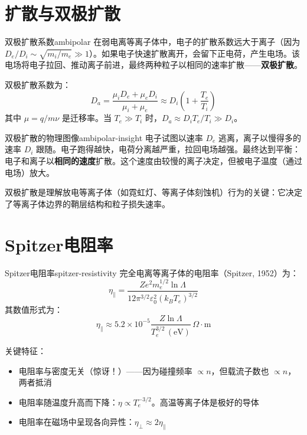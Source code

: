 \documentclass[12pt,a4paper,openany,oneside]{book}
\newcommand{\eps}{\varepsilon}
\newcommand{\difficulty}[1]{\marginnote{\textcolor{red}{\textbf{[#1]}}}}
\begin{document}
\section{扩散与双极扩散}\difficulty{基础}

\begin{theorem}{双极扩散系数}{ambipolar}
在弱电离等离子体中，电子的扩散系数远大于离子（因为 $D_e/D_i \sim \sqrt{m_i/m_e} \gg 1$）。如果电子快速扩散离开，会留下正电荷，产生电场。该电场将电子拉回、推动离子前进，最终两种粒子以相同的速率扩散——\textbf{双极扩散}。

双极扩散系数为：
\[
D_a = \frac{\mu_i D_e + \mu_e D_i}{\mu_i + \mu_e} \approx D_i\left(1 + \frac{T_e}{T_i}\right)
\]
其中 $\mu = q/m\nu$ 是迁移率。当 $T_e \gg T_i$ 时，$D_a \approx D_i T_e/T_i \gg D_i$。
\end{theorem}

\begin{insight}{双极扩散的物理图像}{ambipolar-insight}
电子试图以速率 $D_e$ 逃离，离子以慢得多的速率 $D_i$ 跟随。电子跑得越快，电荷分离越严重，拉回电场越强。最终达到平衡：电子和离子以\textbf{相同的速度}扩散。这个速度由较慢的离子决定，但被电子温度（通过电场）放大。

双极扩散是理解放电等离子体（如霓虹灯、等离子体刻蚀机）行为的关键：它决定了等离子体边界的鞘层结构和粒子损失速率。
\end{insight}

\section{Spitzer电阻率}\difficulty{提高}

\begin{theorem}{Spitzer电阻率}{spitzer-resistivity}
完全电离等离子体的电阻率（Spitzer, 1952）为：
\[
\eta_{\parallel} = \frac{Ze^2 m_e^{1/2} \ln\Lambda}{12\pi^{3/2}\eps_0^2 (k_B T_e)^{3/2}}
\]
其数值形式为：
\[
\eta_{\parallel} \approx 5.2\times 10^{-5} \frac{Z \ln\Lambda}{T_e^{3/2}\,\mathrm{(eV)}}\,\Omega\cdot\mathrm{m}
\]

关键特征：
\begin{itemize}
\item 电阻率与密度无关（惊讶！）——因为碰撞频率 $\propto n$，但载流子数也 $\propto n$，两者抵消
\item 电阻率随温度升高而下降：$\eta \propto T_e^{-3/2}$。高温等离子体是极好的导体
\item 电阻率在磁场中呈现各向异性：$\eta_\perp \approx 2\eta_\parallel$
\end{itemize}
\end{theorem}
\end{document}
